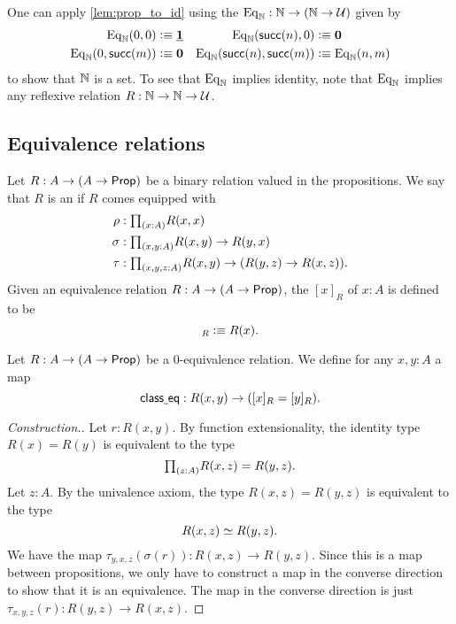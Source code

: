 \begin{eg}
One can apply \cref{lem:prop_to_id} using the  $\mathrm{Eq}_\mathbb{N}:\mathbb{N}\to (\mathbb{N}\to\mathcal{U})$ given by
\begin{align*}
\mathrm{Eq}_\mathbb{N}(0,0) & \vcentcolon\equiv \underline{\mathbf{1}} & \mathrm{Eq}_\mathbb{N}(\mathsf{succ}(n),0) & \vcentcolon\equiv \mathbf{0} \\
\mathrm{Eq}_\mathbb{N}(0,\mathsf{succ}(m)) & \vcentcolon\equiv \mathbf{0} & \mathrm{Eq}_\mathbb{N}(\mathsf{succ}(n),\mathsf{succ}(m)) & \vcentcolon\equiv \mathrm{Eq}_\mathbb{N}(n,m)
\end{align*}
to show that $\mathbb{N}$ is a set. To see that $\mathrm{Eq}_\mathbb{N}$ implies identity, note that $\mathrm{Eq}_\mathbb{N}$ implies any reflexive relation $R:\mathbb{N}\to\mathbb{N}\to\mathcal{U}$.
\end{eg}

\subsection{Equivalence relations}

\begin{defn}\label{defn:eq_rel}
Let $R:A\to (A\to\mathsf{Prop})$ be a binary relation valued in the propositions. We say that $R$ is an  if $R$ comes equipped with
\begin{align*}
\rho & : \prd{x:A}R(x,x) \\
\sigma & : \prd{x,y:A} R(x,y)\to R(y,x) \\
\tau & : \prd{x,y,z:A} R(x,y)\to (R(y,z)\to R(x,z)).
\end{align*}
Given an equivalence relation $R:A\to (A\to\mathsf{Prop})$, the  $[x]_R$ of $x:A$ is defined to be
\begin{equation*}
[x]_R\defeq R(x).
\end{equation*}
\end{defn}

\begin{defn}
Let $R:A\to (A\to\mathsf{Prop})$ be a $0$-equivalence relation. 
We define for any $x,y:A$ a map
\begin{equation*}
\mathsf{class\underline{\ }{}eq}:R(x,y)\to ([x]_R=[y]_R).
\end{equation*}
\end{defn}

\begin{proof}[Construction.]
Let $r:R(x,y)$. By function extensionality, the identity type $R(x)=R(y)$ is equivalent to the type
\begin{equation*}
\prd{z:A}R(x,z)=R(y,z).
\end{equation*}
Let $z:A$. By the univalence axiom, the type $R(x,z)=R(y,z)$ is equivalent to the type
\begin{equation*}
\eqv{R(x,z)}{R(y,z)}.
\end{equation*}
We have the map $\tau_{y,x,z}(\sigma(r)):R(x,z)\to R(y,z)$. Since this is a map between propositions, we only have to construct a map in the converse direction to show that it is an equivalence. The map in the converse direction is just $\tau_{x,y,z}(r):R(y,z)\to R(x,z)$. 
\end{proof}

